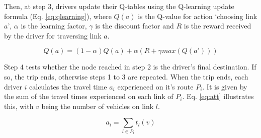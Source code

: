 \documentclass[12pt]{article}
\newcommand{\route}[1]{\ensuremath{P_#1}}	%
\newcommand{\travTime}{\ensuremath{t_l}} 	%
\newcommand{\veh}{\ensuremath{v}}		%
\newcommand{\att}[1]{\ensuremath{a_#1}}		%
\newcommand{\reward}[1][]{\ensuremath{R_#1}}	%
\begin{document}

Then, at step 3, drivers update their Q-tables using the Q-learning update formula (Eq. \eqref{eq:qlearning}), where $Q(a)$ is the Q-value for action `choosing link $a$', $\alpha$ is the learning factor, $\gamma$ is the discount factor and $R$ is the reward received by the driver for traversing link $a$.

\begin{equation}
\label{eq:qlearning}
Q(a) = (1 - \alpha) Q(a) + \alpha (R + \gamma max(Q(a')))
\end{equation}


Step 4 tests whether the node reached in step 2 is the driver's final destination. If so, the trip ends, otherwise steps 1 to 3 are repeated. When the trip ends, each driver $i$ calculates the travel time $\att{i}$ experienced on it's route $\route{i}$. It is given by the sum of the travel times experienced on each link of $\route{i}$. Eq. \eqref{eq:att} illustrates this, with $\veh$ being the number of vehicles on link $l$.

\begin{equation}
\label{eq:att}
\att{i} = \sum_{l \in \route{i}} \travTime(\veh)
\end{equation}



\end{document}
